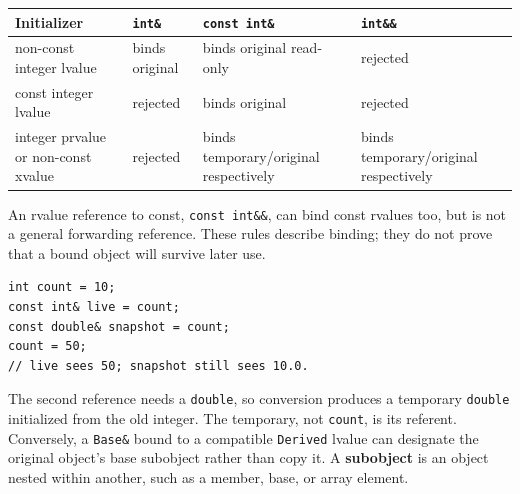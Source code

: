 {\def\LTcaptype{none} %
\begin{longtable}[]{@{}
  >{\raggedright\arraybackslash}p{}
  >{\raggedright\arraybackslash}p{}
  >{\raggedright\arraybackslash}p{}
  >{\raggedright\arraybackslash}p{}@{}}
\toprule\noalign{}
\begin{minipage}[b]{\linewidth}\raggedright
Initializer
\end{minipage} & \begin{minipage}[b]{\linewidth}\raggedright
\texttt{int\&}
\end{minipage} & \begin{minipage}[b]{\linewidth}\raggedright
\texttt{const\ int\&}
\end{minipage} & \begin{minipage}[b]{\linewidth}\raggedright
\texttt{int\&\&}
\end{minipage} \\
\midrule\noalign{}
\endhead
\bottomrule\noalign{}
\endlastfoot
non-const integer lvalue & binds original & binds original read-only & rejected \\
const integer lvalue & rejected & binds original & rejected \\
integer prvalue or non-const xvalue & rejected & binds temporary/original respectively & binds temporary/original respectively \\
\end{longtable}
}

An rvalue reference to const, \texttt{const\ int\&\&}, can bind const rvalues too, but is not a general forwarding reference. These rules describe binding; they do not prove that a bound object will survive later use.

\begin{verbatim}
int count = 10;
const int& live = count;
const double& snapshot = count;
count = 50;
// live sees 50; snapshot still sees 10.0.
\end{verbatim}

The second reference needs a \texttt{double}, so conversion produces a temporary \texttt{double} initialized from the old integer. The temporary, not \texttt{count}, is its referent. Conversely, a \texttt{Base\&} bound to a compatible \texttt{Derived} lvalue can designate the original object's base subobject rather than copy it. A \textbf{subobject} is an object nested within another, such as a member, base, or array element.

